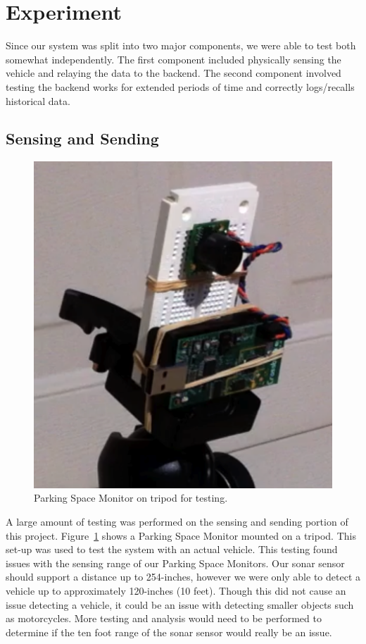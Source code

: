 \documentclass{acm_proc}
\begin{document}
\section{Experiment}\label{sec:experiment}

Since our system was split into two major components, we were able to test
both somewhat independently. 
The first component included physically sensing the vehicle and relaying
the data to the backend.
The second component involved testing the backend works for extended
periods of time and correctly logs/recalls historical data.

\subsection{Sensing and Sending}

\begin{figure}
    \begin{center}
		\includegraphics[width=\columnwidth]{figures/parking_sensor}
	\end{center}
	\caption{Parking Space Monitor on tripod for testing.}
	\label{fig:parking_sensor}
\end{figure}

A large amount of testing was performed on the sensing and sending portion
of this project.  Figure~\ref{fig:parking_sensor} shows a Parking Space
Monitor mounted on a tripod.  This set-up was used to test the system with
an actual vehicle.  This testing found issues with the sensing range of our
Parking Space Monitors.
Our sonar sensor should support a distance up to 254-inches, however we
were only able to detect a vehicle up to approximately 120-inches (10
feet).  Though this did not cause an issue detecting a vehicle, it could be
an issue with detecting smaller objects such as motorcycles.  More testing
and analysis would need to be performed to determine if the ten foot range
of the sonar sensor would really be an issue.
\end{document}
